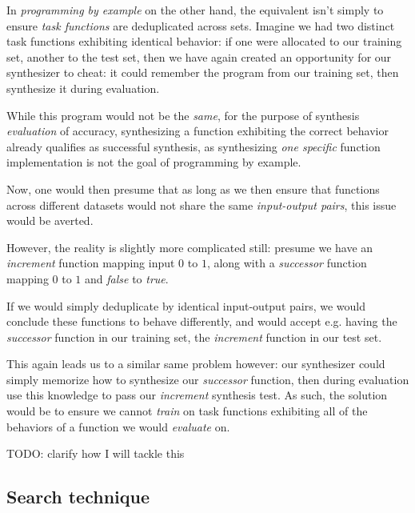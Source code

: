 \documentclass{article}
\begin{document}
In \emph{programming by example} on the other hand,
the equivalent isn't simply to ensure \emph{task functions} are deduplicated across sets.
Imagine we had two distinct task functions exhibiting identical behavior:
if one were allocated to our training set,
another to the test set,
then we have again created an opportunity for our synthesizer to cheat:
it could remember the program from our training set,
then synthesize it during evaluation.

While this program would not be the \emph{same},
for the purpose of synthesis \emph{evaluation} of accuracy,
synthesizing a function exhibiting the correct behavior already qualifies as successful synthesis,
as synthesizing \emph{one specific} function implementation is not the goal of programming by example.

Now, one would then presume that as long as we then ensure
that functions across different datasets
would not share the same \emph{input-output pairs},
this issue would be averted.

However, the reality is slightly more complicated still:
presume we have an \emph{increment} function mapping input $0$ to $1$,
along with a \emph{successor} function mapping $0$ to $1$ and \emph{false} to \emph{true}.

If we would simply deduplicate by identical input-output pairs,
we would conclude these functions to behave differently,
and would accept e.g. having the \emph{successor} function in our training set,
the \emph{increment} function in our test set.

This again leads us to a similar same problem however:
our synthesizer could simply memorize how to synthesize our \emph{successor} function,
then during evaluation use this knowledge to pass our \emph{increment} synthesis test.
As such, the solution would be to ensure we cannot \emph{train} on task functions exhibiting all of the behaviors of a function we would \emph{evaluate} on.

  TODO: clarify how I will tackle this


\subsection{Search technique}
\end{document}
